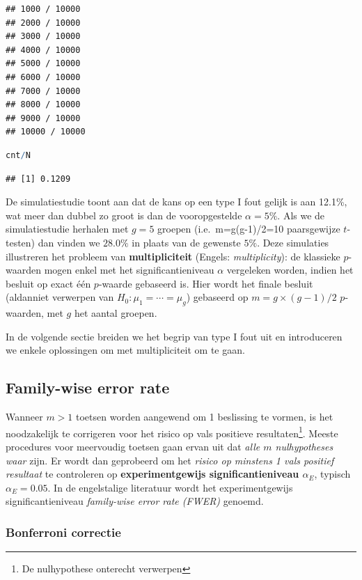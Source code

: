 \documentclass[
  12pt,dutch,coursenotes]{book}
\begin{document}
\begin{lstlisting}
## 1000 / 10000 
## 2000 / 10000 
## 3000 / 10000 
## 4000 / 10000 
## 5000 / 10000 
## 6000 / 10000 
## 7000 / 10000 
## 8000 / 10000 
## 9000 / 10000 
## 10000 / 10000
\end{lstlisting}

\begin{lstlisting}[language=R]
cnt/N
\end{lstlisting}

\begin{lstlisting}
## [1] 0.1209
\end{lstlisting}

De simulatiestudie toont aan dat de kans op een type I fout gelijk is aan 12.1\%, wat meer dan dubbel zo groot is dan de vooropgestelde \(\alpha=5\%\).
Als we de simulatiestudie herhalen met \(g=5\) groepen (i.e.~m=g(g-1)/2=10 paarsgewijze \(t\)-testen) dan vinden we \(28.0\%\) in plaats van de gewenste \(5\%\).
Deze simulaties illustreren het probleem van \textbf{multipliciteit} (Engels: \emph{multiplicity}): de klassieke \(p\)-waarden mogen enkel met het significantieniveau \(\alpha\) vergeleken worden, indien het besluit op exact één \(p\)-waarde gebaseerd is. Hier wordt het finale besluit (aldanniet verwerpen van \(H_0: \mu_1=\cdots =\mu_g\)) gebaseerd op \(m=g\times(g-1)/2\) \(p\)-waarden, met \(g\) het aantal groepen.

In de volgende sectie breiden we het begrip van type I fout uit en introduceren we enkele oplossingen om met multipliciteit om te gaan.

\hypertarget{family-wise-error-rate}{%
\subsection{Family-wise error rate}\label{family-wise-error-rate}}

Wanneer \(m>1\) toetsen worden aangewend om 1 beslissing te vormen, is het noodzakelijk te corrigeren voor het risico op vals positieve resultaten\footnote{De nulhypothese onterecht verwerpen}.
Meeste procedures voor meervoudig toetsen gaan ervan uit dat \emph{alle \(m\) nulhypotheses waar} zijn.
Er wordt dan geprobeerd om het \emph{risico op minstens 1 vals positief resultaat} te controleren op \textbf{experimentgewijs significantieniveau \(\alpha_E\)}, typisch \(\alpha_E=0.05\). In de engelstalige literatuur wordt het experimentgewijs significantieniveau \emph{family-wise error rate (FWER)} genoemd.

\hypertarget{bonferroni-correctie}{%
\subsubsection{Bonferroni correctie}\label{bonferroni-correctie}}
\end{document}
